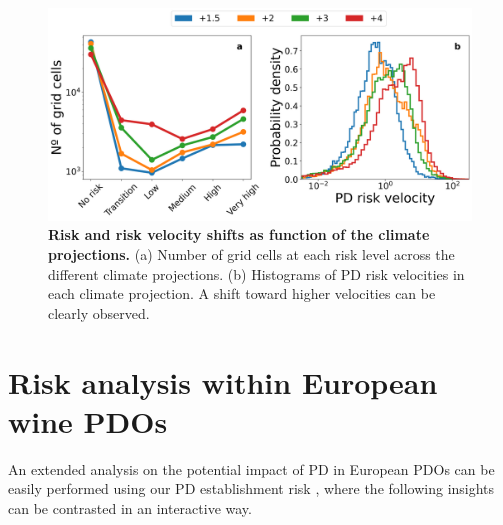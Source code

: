 \begin{figure}[H]
    \centering

    \includegraphics[width=\textwidth]{Figures/Future_risk_velocity_vector_histogram.png}
    \caption[Risk and risk velocity shifts as function of the
        climate projections]{\textbf{Risk and risk velocity shifts as function
            of
            the
            climate projections.} (a) Number of grid cells at each risk level
        across the
        different climate projections. (b) Histograms of PD risk velocities in
        each
        climate projection. A shift toward higher velocities can be clearly
        observed.}
    \label{fig:PD_future_risk_velocity}
\end{figure}

\section{Risk analysis within European wine PDOs}

An extended analysis on the potential impact of PD in European PDOs can be
easily performed using our PD establishment risk \webpage, where the following
insights can be contrasted in an interactive way.

